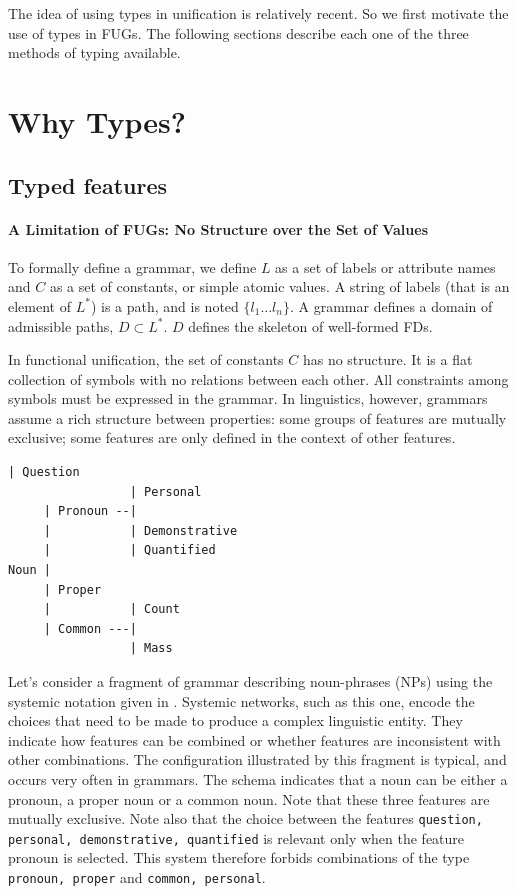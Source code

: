 \documentclass[10pt,a4paper]{report}
\begin{document}
The idea of using types in unification is relatively recent.  So we first
motivate the use of types in FUGs.  The following sections describe each
one of the three methods of typing available.

\section{Why Types?}

\subsection{Typed features}

\paragraph{A Limitation of FUGs: No Structure over the Set of Values}

To formally define a grammar, we define $L$ as a set of labels
or attribute names and $C$ as a set of constants, or simple atomic
values. A string of labels (that is an element of $L^*$) is
a path, and is noted $\{l_1 \ldots l_n\}$.  A grammar defines a domain
of admissible paths, $D \subset L^*$. $D$ defines the skeleton of well-formed FDs.

In functional unification, the set of constants $C$ has no structure.  It
is a flat collection of symbols with no relations between each other.  All
constraints among symbols must be expressed in the grammar.  In
linguistics, however, grammars assume a rich structure between properties:
some groups of features are mutually exclusive; some features are only
defined in the context of other features.

\begin{lstlisting}[language=Lisp]
                 | Question
                 | Personal
     | Pronoun --|
     |           | Demonstrative
     |           | Quantified
Noun |
     | Proper
     |           | Count
     | Common ---|
                 | Mass
\end{lstlisting}

Let's consider a fragment of grammar describing noun-phrases (NPs) using
the systemic notation given in \cite{Winograd83}.  Systemic networks, such
as this one, encode the choices that need to be made to produce a complex
linguistic entity.  They indicate how features can be combined or whether
features are inconsistent with other combinations.  The configuration
illustrated by this fragment is typical, and occurs very often in grammars.
The schema indicates that a noun can be either a pronoun, a proper noun or
a common noun.  Note that these three features are mutually exclusive. Note
also that the choice between the features {\tt {question, personal,
demonstrative, quantified}} is relevant only when the feature pronoun is
selected.  This system therefore forbids combinations of the type
{\tt {pronoun, proper}} and {\tt {common, personal}}.
\end{document}
